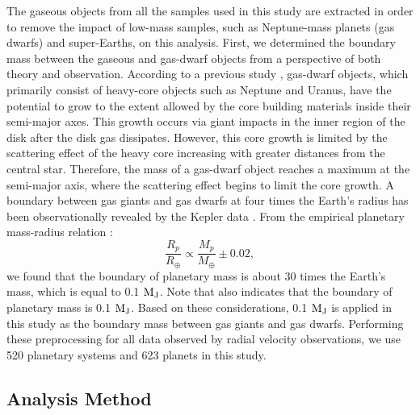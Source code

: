 \documentclass[twocolumn, dvipdfmx]{aastex62}
\begin{document}
\begin{CJK*}{UTF8}{min}
The gaseous objects from all the samples used in this study are extracted in order to remove the impact of low-mass samples, such as Neptune-mass planets (gas dwarfs) and super-Earths, on this analysis. First, we determined the boundary mass between the gaseous and gas-dwarf objects from a perspective of both theory and observation. According to a previous study \citep{2004ApJ...604..388I}, gas-dwarf objects, which primarily consist of heavy-core objects such as Neptune and Uranus, have the potential to grow to the extent allowed by the core building materials inside their semi-major axes. This growth occurs via giant impacts in the inner region of the disk after the disk gas dissipates. However, this core growth is limited by the scattering effect of the heavy core increasing with greater distances from the central star. Therefore, the mass of a gas-dwarf object reaches a maximum at the semi-major axis, where the scattering effect begins to limit the core growth. A boundary between gas giants and gas dwarfs at four times the Earth's radius has been observationally revealed by the Kepler data \citep{2012Natur.486..375B}. From the empirical planetary mass-radius relation \citep{2017A&A...604A..83B}:
\begin{equation}
\frac{R_p}{R_\oplus} \propto \frac{M_p}{M_\oplus}\pm0.02 ,
\end{equation}
we found that the boundary of planetary mass is about 30 times the Earth's mass, which is equal to 0.1 $\rm M_J$. Note that \cite{2004ApJ...604..388I} also indicates that the boundary of planetary mass is 0.1 $\rm M_J$. Based on these considerations, 0.1 $\rm M_J$ is applied in this study as the boundary mass between gas giants and gas dwarfs. Performing these preprocessing for all data observed by radial velocity observations, we use 520 planetary systems and 623 planets in this study.


\subsection{Analysis Method} \label{analysis}


\end{CJK*}
\end{document}
